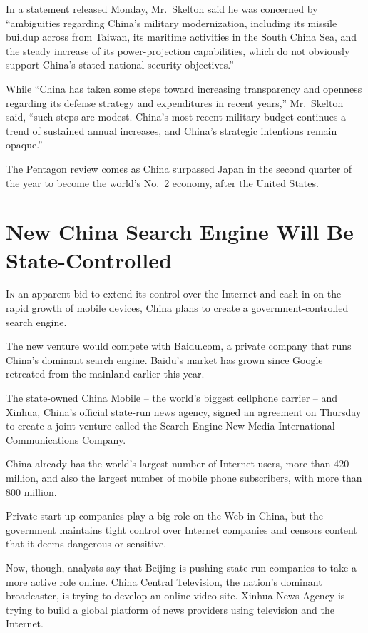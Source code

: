 ﻿\documentclass[12pt]{article}
\begin{document}
In a statement released Monday, Mr.~Skelton said he was concerned by ``ambiguities regarding China's
military modernization, including its missile buildup across from Taiwan, its maritime activities in
the South China Sea, and the steady increase of its power-projection capabilities, which do not
obviously support China's stated national security objectives.''

While ``China has taken some steps toward increasing transparency and openness regarding its defense
strategy and expenditures in recent years,'' Mr.~Skelton said, ``such steps are modest. China's most
recent military budget continues a trend of sustained annual increases, and China's strategic
intentions remain opaque.''

The Pentagon review comes as China surpassed Japan in the second quarter of the year to become the
world's No.~2 economy, after the United States.

\section{New China Search Engine Will Be State-Controlled}

\lettrine{I}{n} an apparent bid to extend its control over the Internet and
cash in on the rapid growth of mobile devices, China plans to create a government-controlled search
engine.

The new venture would compete with Baidu.com, a private company that runs China's dominant search
engine. Baidu's market has grown since Google retreated from the mainland earlier this year.

The state-owned China Mobile -- the world's biggest cellphone carrier -- and Xinhua, China's
official state-run news agency, signed an agreement on Thursday to create a joint venture called the
Search Engine New Media International Communications Company.

China already has the world's largest number of Internet users, more than 420 million, and also the
largest number of mobile phone subscribers, with more than 800 million.

Private start-up companies play a big role on the Web in China, but the government maintains tight
control over Internet companies and censors content that it deems dangerous or sensitive.

Now, though, analysts say that Beijing is pushing state-run companies to take a more active role
online. China Central Television, the nation's dominant broadcaster, is trying to develop an online
video site. Xinhua News Agency is trying to build a global platform of news providers using
television and the Internet.
\end{document}
